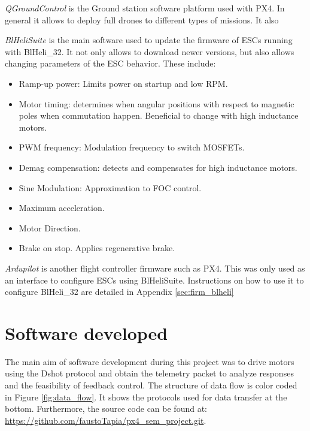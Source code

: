 \textit{QGroundControl} is the Ground station software platform used with PX4. In general it allows to deploy full drones to different types of missions. It also 
\newline

\textit{BlHeliSuite} is the main software used to update the firmware of ESCs running with BlHeli\_32. It not only allows to download newer versions, but also allows changing parameters of the ESC behavior. These include:

\begin{itemize}
	\item Ramp-up power: Limits power on startup and low RPM.
	\item Motor timing: determines when angular positions with respect to magnetic poles when commutation happen. Beneficial to change with high inductance motors.
	\item PWM frequency: Modulation frequency to switch MOSFETs.
	\item Demag compensation: detects and compensates for high inductance motors.
	\item Sine Modulation: Approximation to FOC control.
	\item Maximum acceleration.
	\item Motor Direction.
	\item Brake on stop. Applies regenerative brake.
\end{itemize}

\textit{Ardupilot} is another flight controller firmware such as PX4. This was only used as an interface to configure ESCs using BlHeliSuite. Instructions on how to use it to configure BlHeli\_32 are detailed in Appendix \ref{sec:firm_blheli}
\newline

\section{Software developed}
The main aim of software development during this project was to drive motors using the Dshot protocol and obtain the telemetry packet to analyze responses and the feasibility of feedback control. The structure of data flow is color coded in Figure \ref{fig:data_flow}. It shows the protocols used for data transfer  at the bottom. Furthermore, the source code can be found at: \newline
\url{https://github.com/faustoTapia/px4_sem_project.git}.

